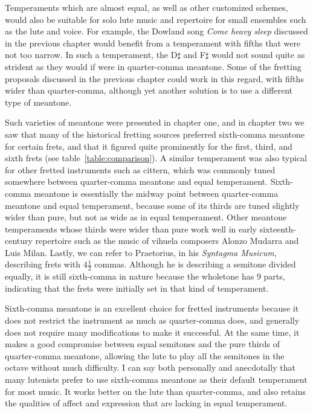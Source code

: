 Temperaments which are almost equal, as well as other customized schemes, would also be suitable for solo lute music and
repertoire for small ensembles such as the lute and voice. For example, the Dowland song \textit{Come heavy sleep}
discussed in the previous chapter would benefit from a temperament with fifths that were not too narrow. In such a
temperament, the D$\sharp$ and F$\sharp$ would not sound quite as strident as they would if were in quarter-comma
meantone. Some of the fretting proposals discussed in the previous chapter could work in this regard, with fifths wider
than quarter-comma, although yet another solution is to use a different type of meantone.

Such varieties of meantone were presented in chapter one, and in chapter two we saw that many of the historical fretting
sources preferred sixth-comma meantone for certain frets, and that it figured quite prominently for the first, third,
and sixth frets (see table~\ref{table:comparison}). A similar temperament was also typical for other fretted instruments
such as cittern, which was commonly tuned somewhere between quarter-comma meantone and equal temperament.
\autocite[12]{PF:1} Sixth-comma meantone is essentially the midway point between quarter-comma meantone and equal
temperament, because some of its thirds are tuned slightly wider than pure, but not as wide as in equal temperament.
Other meantone temperaments whose thirds were wider than pure work well in early sixteenth-century repertoire such as
the music of vihuela composers Alonzo Mudarra and Luis Milan.\autocite[56]{WH:1} Lastly, we can refer to Praetorius, in
his \textit{Syntagma Musicum}, describing frets with 4$ \frac{1}{2} $ commas.\autocite[68]{MP:1} Although he is
describing a semitone divided equally, it is still sixth-comma in nature because the wholetone has 9 parts, indicating
that the frets were initially set in that kind of temperament.

Sixth-comma meantone is an excellent choice for fretted instruments because it does not restrict the instrument as much
as quarter-comma does, and generally does not require many modifications to make it successful. At the same time, it
makes a good compromise between equal semitones and the pure thirds of quarter-comma meantone, allowing the lute to play
all the semitones in the octave without much difficulty. I can say both personally and anecdotally that many lutenists
prefer to use sixth-comma meantone as their default temperament for most music. It works better on the lute than
quarter-comma, and also retains the qualities of affect and expression that are lacking in equal temperament.

